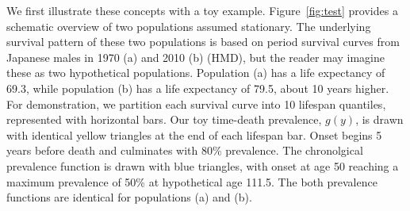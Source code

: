 \documentclass[11pt,oneside,a4paper]{article} %
\begin{document}
We first illustrate these concepts with a toy example. Figure~\ref{fig:test}
provides a schematic overview of two populations assumed stationary. The
underlying survival pattern of these two populations is based on period survival
curves from Japanese males in 1970 (a) and 2010 (b) (HMD), but the reader may
imagine these as two hypothetical populations. Population (a) has a life
expectancy of 69.3, while population (b) has a life expectancy of 79.5, about 10
years higher. For demonstration, we partition each survival curve into 10
lifespan quantiles, represented with horizontal bars. Our toy time-death
prevalence, $g(y)$, is drawn with identical yellow triangles at the end of each
lifespan bar. Onset begins 5 years before death and culminates with 80\%
prevalence. The chronolgical prevalence function is drawn with blue triangles,
with onset at age 50 reaching a maximum prevalence of 50\% at hypothetical age
111.5. The both prevalence functions are identical for populations (a) and (b). 
\end{document}
